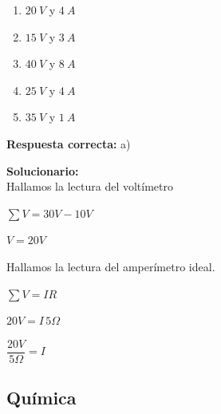 \begin{enumerate}
	\begin{enumerate}[label=\alph*)]
		\item $20\ V$ y $4\ A$
		\item $15\ V$ y $3\ A$
		\item $40\ V$ y $8\ A$
		\item $25\ V$ y $4\ A$
		\item $35\ V$ y $1\ A$
	\end{enumerate}
	\textbf{Respuesta correcta:} a)
	
	\vspace{2mm}
	\textbf{Solucionario:}\\
	
	Hallamos la lectura del voltímetro
	
	$\sum V=30V-10V$
	
	$V=20V$
	
	Hallamos la lectura del amperímetro ideal.
	
	$\sum V=IR$
	
	$20V=I\,5\Omega$
	
	$\dfrac{20V}{5\Omega}=I$
	
	
	\vspace{6mm}
	
\end{enumerate}






\subsection*{Química}

